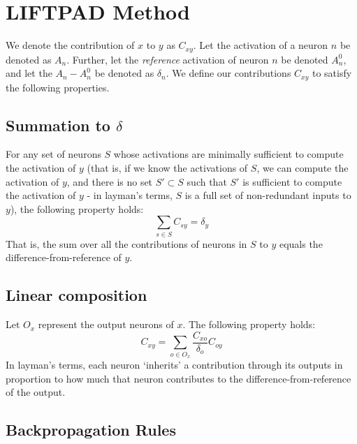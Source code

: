 \documentclass{article}
\begin{document}
\section{LIFTPAD Method}
\label{LIFTPAD}

We denote the contribution of $x$ to $y$ as $C_{xy}$. Let the activation of a neuron $n$ be denoted as $A_n$. Further, let the \emph{reference} activation of neuron $n$ be denoted $A_n^0$, and let the $A_n - A_n^0$ be denoted as $\delta_n$. We define our contributions $C_{xy}$ to satisfy the following properties.

\subsection{Summation to $\delta$}

For any set of neurons $S$ whose activations are minimally sufficient to compute the activation of $y$ (that is, if we know the activations of $S$, we can compute the activation of $y$, and there is no set $S' \subset S$ such that $S'$ is sufficient to compute the activation of $y$ - in layman's terms, $S$ is a full set of non-redundant inputs to $y$), the following property holds:
\begin{equation}
\sum_{s \in S} C_{sy} = \delta_y
\end{equation}
That is, the sum over all the contributions of neurons in $S$ to $y$ equals the difference-from-reference of $y$.

\subsection{Linear composition}

Let $O_x$ represent the output neurons of $x$. The following property holds:\\
\begin{equation}
C_{xy} = \sum_{o \in O_x} \frac{C_{xo}}{\delta_o}C_{oy}
\end{equation}
In layman's terms, each neuron `inherits' a contribution through its outputs in proportion to how much that neuron contributes to the difference-from-reference of the output.

\subsection{Backpropagation Rules}
\end{document}
